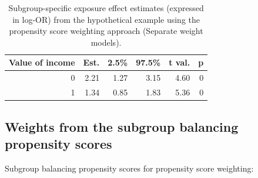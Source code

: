 \documentclass[
  letterpaper,
  DIV=11,
  numbers=noendperiod]{scrreprt}
\newenvironment{Shaded}{\begin{snugshade}}{\end{snugshade}}
\newcommand{\AttributeTok}[1]{\textcolor[rgb]{0.40,0.45,0.13}{#1}}
\newcommand{\ConstantTok}[1]{\textcolor[rgb]{0.56,0.35,0.01}{#1}}
\newcommand{\DecValTok}[1]{\textcolor[rgb]{0.68,0.00,0.00}{#1}}
\newcommand{\FunctionTok}[1]{\textcolor[rgb]{0.28,0.35,0.67}{#1}}
\newcommand{\NormalTok}[1]{\textcolor[rgb]{0.00,0.23,0.31}{#1}}
\newcommand{\OtherTok}[1]{\textcolor[rgb]{0.00,0.23,0.31}{#1}}
\newcommand{\SpecialCharTok}[1]{\textcolor[rgb]{0.37,0.37,0.37}{#1}}
\newcommand{\StringTok}[1]{\textcolor[rgb]{0.13,0.47,0.30}{#1}}
\begin{document}
\hypertarget{tbl-sep-model2}{}
\begin{table}[!h]
\caption{\label{tbl-sep-model2}Subgroup-specific exposure effect estimates (expressed in log-OR) from
the hypothetical example using the propensity score weighting approach
(Separate weight models). }\tabularnewline

\centering
\begin{tabular}{rrrrrr}
\toprule
Value of income & Est. & 2.5\% & 97.5\% & t val. & p\\
\midrule
0 & 2.21 & 1.27 & 3.15 & 4.60 & 0\\
1 & 1.34 & 0.85 & 1.83 & 5.36 & 0\\
\bottomrule
\end{tabular}
\end{table}

\hypertarget{weights-from-the-subgroup-balancing-propensity-scores}{%
\subsection{Weights from the subgroup balancing propensity
scores}\label{weights-from-the-subgroup-balancing-propensity-scores}}

Subgroup balancing propensity scores for propensity score weighting:

\begin{Shaded}
\end{Shaded}
\end{document}
